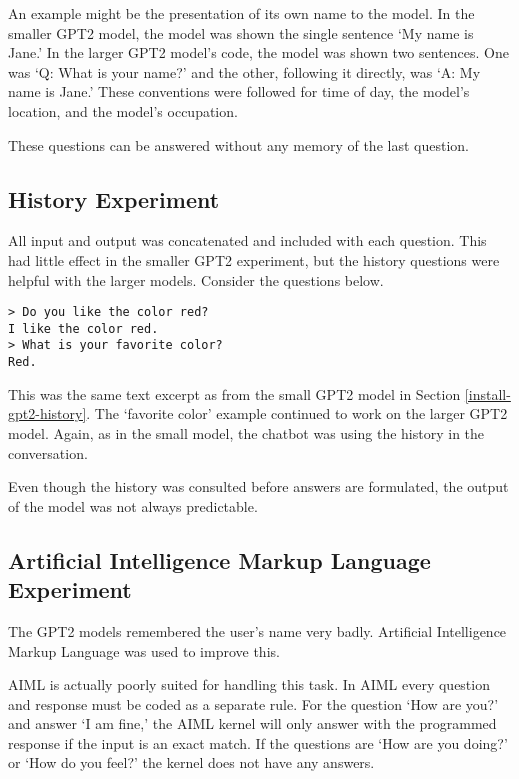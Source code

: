 An example might be the presentation of its own name to the model. In the smaller GPT2 model, the model was shown the single sentence `My name is Jane.' In the larger GPT2 model's code, the model was shown two sentences. One was `Q: What is your name?' and the other, following it directly, was `A: My name is Jane.' These conventions were followed for time of day, the model's location, and the model's occupation.

These questions can be answered without any memory of the last question.

\subsection{History Experiment}

All input and output was concatenated and included with each question. This had little effect in the smaller GPT2 experiment, but the history questions were helpful with the larger models. Consider the questions below.
\begin{verbatim}
> Do you like the color red?
I like the color red.
> What is your favorite color?
Red.
\end{verbatim}
This was the same text excerpt as from the small GPT2 model in Section \ref{install-gpt2-history}. The `favorite color' example continued to work on the larger GPT2 model. Again, as in the small model, the chatbot was using the history in the conversation. 

Even though the history was consulted before answers are formulated, the output of the model was not always predictable. %


\subsection{Artificial Intelligence Markup Language Experiment}

The GPT2 models remembered the user's name very badly. %
Artificial Intelligence Markup Language was used to improve this. 

AIML is actually poorly suited for handling this task. In AIML every question and response must be coded as a separate rule. For the question `How are you?' and answer `I am fine,' the AIML kernel will only answer with the programmed response if the input is an exact match. If the questions are `How are you doing?' or `How do you feel?' the kernel does not have any answers. %

